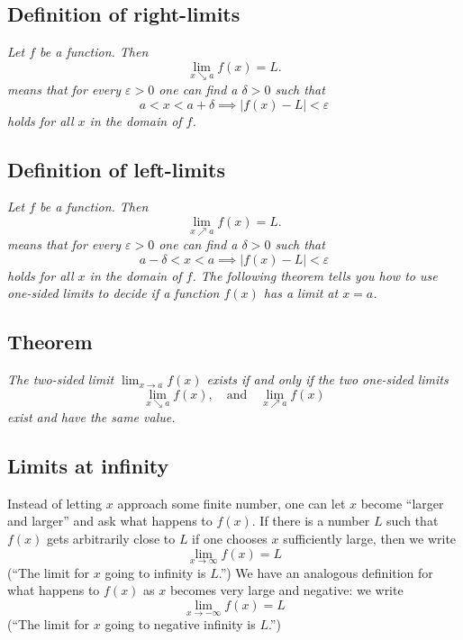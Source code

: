 \subsection{Definition of right-limits} 
\itshape
Let $f$ be a function.  Then
\begin{equation}\label{eq:one-sided-lim-formulation}
  \lim_{x\searrow a} f(x) = L.
\end{equation}
means that for every $\varepsilon>0$ one can find a $\delta>0$ such that
\[
a<x<a+\delta \implies |f(x)-L|<\varepsilon
\]
holds for all $x$ in the domain of $f$.  \upshape
\subsection{Definition of left-limits} 
\itshape
Let $f$ be a function.  Then
\begin{equation}\label{eq:left-sided-lim-formulation}
  \lim_{x\nearrow a} f(x) = L.
\end{equation}
means that for every $\varepsilon>0$ one can find a $\delta>0$ such that
\[
a-\delta<x<a \implies |f(x)-L|<\varepsilon
\]
holds for all $x$ in the domain of $f$.  \upshape
The following
theorem tells you how to use one-sided limits to decide if a function
$f(x)$ has a limit at $x=a$.

\subsection{Theorem}\label{one_sided_limit_thm} 
\itshape%
The two-sided limit $\displaystyle \lim_{x\to a} f(x)$
exists if and only if the two one-sided limits
\[
  \lim_{x\searrow a} f(x), \quad\text{and}\quad \lim_{x\nearrow a} f(x)
\]
exist and have the same value.
\upshape

\subsection{Limits at infinity} 
Instead of letting $x$ approach some finite number, one can let $x$ become
``larger and larger'' and ask what happens to $f(x)$.  If there is a number
$L$ such that $f(x)$ gets arbitrarily close to $L$ if one chooses $x$
sufficiently large, then we write
\[
\lim_{x\to \infty} f(x) = L
\]
(``The limit for $x$ going to infinity is $L$.'')
We have an analogous definition for what happens to $f(x)$ as $x$ becomes very
large and negative: we write
\[
\lim_{x\to -\infty} f(x) = L
\]
(``The limit for $x$ going to negative infinity is $L$.'')
  
